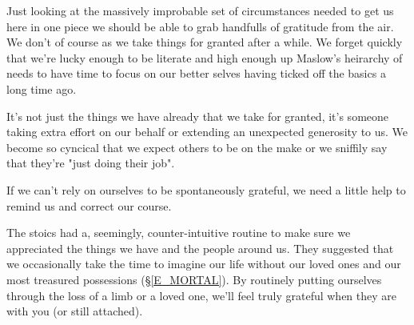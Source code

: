 \cleartorightpage
\begin{multicols}{2}

Just looking at the massively improbable set of circumstances needed to get us here in one piece we should be able to grab handfulls of gratitude from the air. We don't of course as we take things for granted after a while. We forget quickly that we're lucky enough to be literate and high enough up Maslow's heirarchy of needs to have time to focus on our better selves having ticked off the basics a long time ago.

It's not just the things we have already that we take for granted, it's someone taking extra effort on our behalf or extending an unexpected generosity to us. We become so cyncical that we expect others to be on the make or we sniffily say that they're "just doing their job".

If we can't rely on ourselves to be spontaneously grateful, we need a little help to remind us and correct our course.

The stoics had a, seemingly, counter-intuitive routine to make sure we appreciated the things we have and the people around us. They suggested that we occasionally take the time to imagine our life without our loved ones and our most treasured possessions (\S \ref{E_MORTAL}). By routinely putting ourselves through the loss of a limb or a loved one, we'll feel truly grateful when they are with you (or still attached).





\end{multicols}
\clearpage
